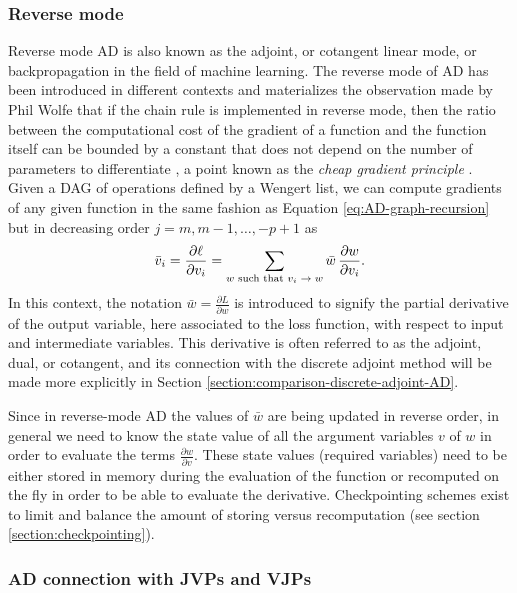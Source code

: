 \subsubsection{Reverse mode}

Reverse mode AD is also known as the adjoint, or cotangent linear mode, or backpropagation in the field of machine learning. 
The reverse mode of AD has been introduced in different contexts \cite{griewank2012invented} and materializes the observation made by Phil Wolfe that if the chain rule is implemented in reverse mode, then the ratio between the computational cost of the gradient of a function and the function itself can be bounded by a constant that does not depend on the number of parameters to differentiate \cite{Griewank_1989, Wolfe_1982}, a point known as the \textit{cheap gradient principle} \cite{griewank2012invented}.  
Given a DAG of operations defined by a Wengert list, we can compute gradients of any given function in the same fashion as Equation \eqref{eq:AD-graph-recursion} but in decreasing order $j=m, m-1, \ldots, -p+1$ as
\begin{equation}
    \bar v_i 
    = 
    \frac{\partial \ell}{\partial v_i}
    = 
    \sum_\text{$w$\text{ such that} $v_i \rightarrow w$}
    \bar{w} \, \frac{\partial w}{\partial v_i}.
    \label{eq:reverse-mode-ad-definition}
\end{equation}
In this context, the notation $\bar{w} = \frac{\partial L}{\partial w}$ is introduced to signify the partial derivative of the output variable, here associated to the loss function, with respect to input and intermediate variables. 
This derivative is often referred to as the adjoint, dual, or cotangent, and its connection with the discrete adjoint method will be made more explicitly in Section \ref{section:comparison-discrete-adjoint-AD}. 

Since in reverse-mode AD the values of $\bar w$ are being updated in reverse order, in general
we need to know the state value of all the argument variables $v$ of $w$ in order to evaluate the terms $\frac{\partial w}{\partial v}$.
These state values (required variables) need to be either stored in memory during the evaluation of the function or recomputed on the fly in order to be able to evaluate the derivative. 
Checkpointing schemes exist to limit and balance the amount of storing versus recomputation (see section \ref{section:checkpointing}).


\subsubsection{AD connection with JVPs and VJPs}
\label{sec:vjp-jvp}


